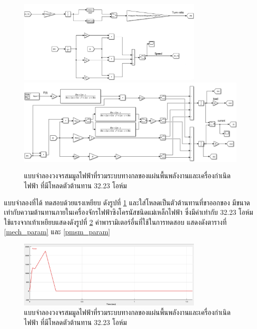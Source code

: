 \documentclass[11pt,a4paper]{article}
\begin{document}
\begin{figure}[H]
    \begin{center}
        \includegraphics[width=0.8\textwidth]{sim_elecmech_2.png}
        \includegraphics[width=1\textwidth]{sim_elecmech_3.png}
    \end{center}
    \caption{แบบจำลองวงจรสมมูลไฟฟ้าที่รวมระบบทางกลของแผ่นพื้นพลังงานและเครื่องกำเนิดไฟฟ้า ที่มีโหลดตัวต้านทาน 32.23 โอห์ม}
    \label{sim_elecmech}
\end{figure}

แบบจำลองที่ได้ ทดสอบด้วยแรงเหยียบ ดังรูปที่ \ref{sim_elecmech} และใส่โหลดเป็นตัวต้านทานที่ขาออกของ มีขนาดเท่ากับความต้านทานภายในเครื่องจักรไฟฟ้าซิงโครนัสชนิดแม่เหล็กไฟฟ้า ซึ่งมีค่าเท่ากับ 32.23 โอห์ม ใช้แรงจากเท้าเหยียบแสดงดังรูปที่ \ref{force_sim} ค่าพารามิเตอร์อื่นที่ใช้ในการทดสอบ \cite{GpH:01} แสดงดังตารางที่ \ref{mech_param} และ \ref{pmsm_param}
\begin{figure}[H]
    \begin{center}
        \includegraphics[width=0.8\textwidth]{force_sim.png}
    \end{center}
    \caption{แบบจำลองวงจรสมมูลไฟฟ้าที่รวมระบบทางกลของแผ่นพื้นพลังงานและเครื่องกำเนิดไฟฟ้า ที่มีโหลดตัวต้านทาน 32.23 โอห์ม}
    \label{force_sim}
\end{figure}
\end{document}
